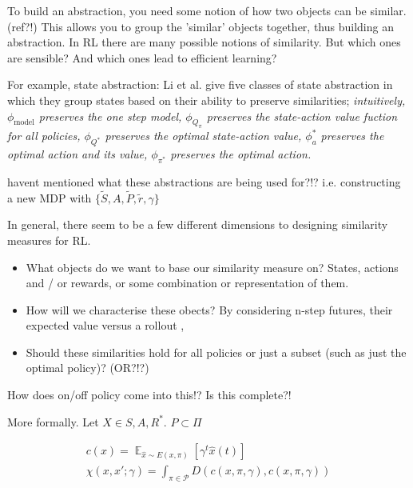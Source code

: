 
To build an abstraction, you need some notion of how two objects can be similar. (ref?!)
This allows you to group the 'similar' objects together, thus building an abstraction.
In RL there are many possible notions of similarity. But which ones are sensible?
And which ones lead to efficient learning?

\vspace{5mm}

For example, state abstraction: Li et al. \cite{Littman2006} give five classes of
state abstraction in which they group states based on their ability to preserve similarities;
\textit{intuitively,
$\phi_{\text{model}}$ preserves the one step model,
$\phi_{Q_{\pi}}$ preserves the state-action value fuction for all policies,
$\phi_{Q^{* }}$ preserves the optimal state-action value,
$\phi_a^{* }$ preserves the optimal action and its value,
$\phi_{\pi^{* }}$ preserves the optimal action.}

{\color{red}havent mentioned what these abstractions are being used for?!?}
i.e. constructing a new MDP with $\{\tilde S, A, \tilde P, \tilde r, \gamma\}$

In general, there seem to be a few different dimensions to designing similarity measures for RL.

\begin{itemize}
  \tightlist
  \item What objects do we want to base our similarity measure on? States, actions and / or rewards, or some combination or representation of them.
  \item How will we characterise these obects? By considering n-step futures, their expected value versus a rollout \footnotemark[9],
  \item Should these similarities hold for all policies or just a subset (such as just the optimal policy)? (OR?!?)
\end{itemize}


{\color{red}How does on/off policy come into this!? Is this complete?!}

More formally. Let $X \in {S, A, R}^{* }$. $P \subset \Pi$

\begin{align*}
c(x) = \mathop{\mathbb E}_{\hat x \sim E(x, \pi)} [\gamma^t \hat x(t)] \\
\chi(x, x'; \gamma) = \int_{\pi \in \mathcal P} D(c(x, \pi, \gamma), c(x, \pi, \gamma))
\end{align*}

